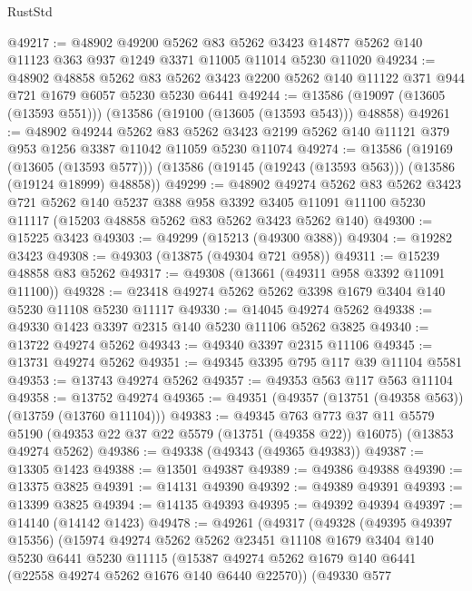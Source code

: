 \begin{lexlean}{RustStd}
\begin{coremodule}
@49217 := @48902
    @49200
    @5262
    @83
    @5262
    @3423
    @14877
    @5262
    @140
    @11123
    @363
    @937
    @1249
    @3371
    @11005
    @11014
    @5230
    @11020
@49234 := @48902
    @48858
    @5262
    @83
    @5262
    @3423
    @2200
    @5262
    @140
    @11122
    @371
    @944
    @721
    @1679
    @6057
    @5230
    @5230
    @6441
@49244 := @13586 (@19097 (@13605 (@13593 @551))) (@13586 (@19100 (@13605 (@13593 @543))) @48858)
@49261 := @48902
    @49244
    @5262
    @83
    @5262
    @3423
    @2199
    @5262
    @140
    @11121
    @379
    @953
    @1256
    @3387
    @11042
    @11059
    @5230
    @11074
@49274 := @13586
    (@19169 (@13605 (@13593 @577)))
    (@13586 (@19145 (@19243 (@13593 @563))) (@13586 (@19124 @18999) @48858))
@49299 := @48902
    @49274
    @5262
    @83
    @5262
    @3423
    @721
    @5262
    @140
    @5237
    @388
    @958
    @3392
    @3405
    @11091
    @11100
    @5230
    @11117
    (@15203 @48858 @5262 @83 @5262 @3423 @5262 @140)
@49300 := @15225 @3423
@49303 := @49299 (@15213 (@49300 @388))
@49304 := @19282 @3423
@49308 := @49303 (@13875 (@49304 @721 @958))
@49311 := @15239 @48858 @83 @5262
@49317 := @49308 (@13661 (@49311 @958 @3392 @11091 @11100))
@49328 := @23418 @49274 @5262 @5262 @3398 @1679 @3404 @140 @5230 @11108 @5230 @11117
@49330 := @14045 @49274 @5262
@49338 := @49330 @1423 @3397 @2315 @140 @5230 @11106 @5262 @3825
@49340 := @13722 @49274 @5262
@49343 := @49340 @3397 @2315 @11106
@49345 := @13731 @49274 @5262
@49351 := @49345 @3395 @795 @117 @39 @11104 @5581
@49353 := @13743 @49274 @5262
@49357 := @49353 @563 @117 @563 @11104
@49358 := @13752 @49274
@49365 := @49351 (@49357 (@13751 (@49358 @563)) (@13759 (@13760 @11104)))
@49383 := @49345
    @763
    @773
    @37
    @11
    @5579
    @5190
    (@49353 @22 @37 @22 @5579 (@13751 (@49358 @22)) @16075)
    (@13853 @49274 @5262)
@49386 := @49338 (@49343 (@49365 @49383))
@49387 := @13305 @1423
@49388 := @13501 @49387
@49389 := @49386 @49388
@49390 := @13375 @3825
@49391 := @14131 @49390
@49392 := @49389 @49391
@49393 := @13399 @3825
@49394 := @14135 @49393
@49395 := @49392 @49394
@49397 := @14140 (@14142 @1423)
@49478 := @49261
    (@49317
      (@49328
        (@49395 @49397 @15356)
        (@15974
          @49274
          @5262
          @5262
          @23451
          @11108
          @1679
          @3404
          @140
          @5230
          @6441
          @5230
          @11115
          (@15387 @49274 @5262 @1679 @140 @6441 (@22558 @49274 @5262 @1676 @140 @6440 @22570))
          (@49330
            @577

\end{coremodule}
\end{lexlean}
